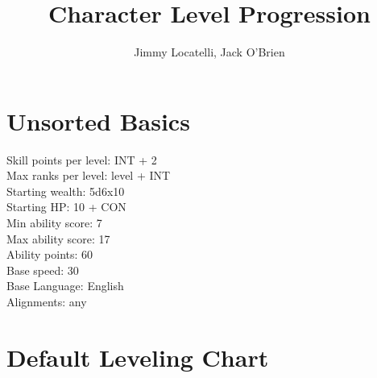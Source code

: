 \documentclass[12pt]{article}
\begin{document}
\title{Character Level Progression}
\author{Jimmy Locatelli, Jack O'Brien}
\maketitle



\section{Unsorted Basics}

Skill points per level: INT + 2\\
Max ranks per level: level + INT\\
Starting wealth: 5d6x10\\
Starting HP: 10 + CON\\
Min ability score: 7\\
Max ability score: 17\\
Ability points: 60\\
Base speed: 30\\
Base Language: English\\
Alignments: any

\section{Default Leveling Chart}
\end{document}
